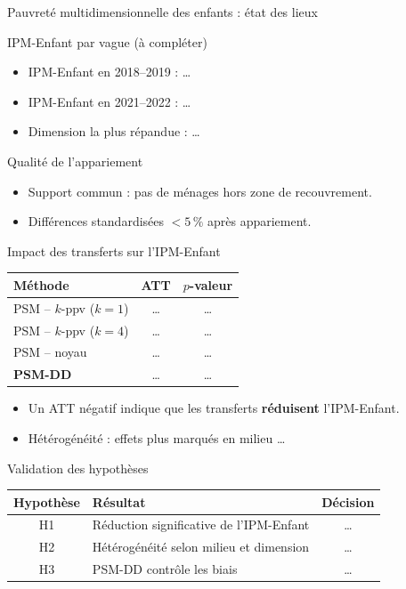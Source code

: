 \documentclass[10pt,aspectratio=169]{beamer}
\begin{document}
\begin{frame}{Pauvreté multidimensionnelle des enfants : état des lieux}
  \begin{block}{IPM-Enfant par vague (à compléter)}
    \begin{itemize}
      \item IPM-Enfant en 2018--2019 : \dots
      \item IPM-Enfant en 2021--2022 : \dots
      \item Dimension la plus répandue : \dots
    \end{itemize}
  \end{block}
  \begin{block}{Qualité de l'appariement}
    \begin{itemize}
      \item Support commun : pas de ménages hors zone de recouvrement.
      \item Différences standardisées $< 5\,\%$ après appariement.
    \end{itemize}
  \end{block}
\end{frame}

\begin{frame}{Impact des transferts sur l'IPM-Enfant}
  \begin{table}
    \centering
    \small
    \begin{tabular}{lcc}
      \toprule
      Méthode & ATT & $p$-valeur \\
      \midrule
      PSM -- $k$-ppv ($k=1$)  & \dots & \dots \\
      PSM -- $k$-ppv ($k=4$)  & \dots & \dots \\
      PSM -- noyau             & \dots & \dots \\
      \midrule
      \textbf{PSM-DD}          & \dots & \dots \\
      \bottomrule
    \end{tabular}
  \end{table}
  \begin{itemize}
    \item Un ATT négatif indique que les transferts \textbf{réduisent} l'IPM-Enfant.
    \item Hétérogénéité : effets plus marqués en milieu \dots
  \end{itemize}
\end{frame}

\begin{frame}{Validation des hypothèses}
  \begin{table}
    \centering
    \begin{tabular}{clc}
      \toprule
      Hypothèse & Résultat & Décision \\
      \midrule
      H1 & Réduction significative de l'IPM-Enfant & \dots \\
      H2 & Hétérogénéité selon milieu et dimension  & \dots \\
      H3 & PSM-DD contrôle les biais                & \dots \\
      \bottomrule
    \end{tabular}
  \end{table}
\end{frame}
\end{document}
